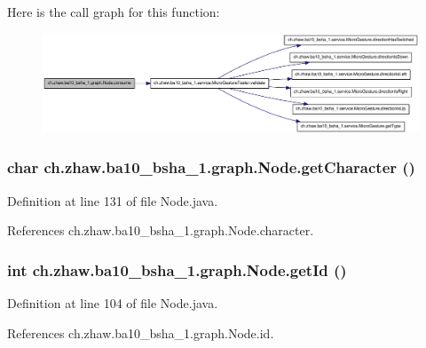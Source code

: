 Here is the call graph for this function:\nopagebreak
\begin{figure}[H]
\begin{center}
\leavevmode
\includegraphics[width=420pt]{classch_1_1zhaw_1_1ba10__bsha__1_1_1graph_1_1Node_a985b135e0ae7c0453985cd1dacdc4bc7_cgraph}
\end{center}
\end{figure}
\hypertarget{classch_1_1zhaw_1_1ba10__bsha__1_1_1graph_1_1Node_a0e84a9cb9ac03506d3a46af0a8f288f5}{
\subsubsection[{getCharacter}]{\setlength{\rightskip}{0pt plus 5cm}char ch.zhaw.ba10\_\-bsha\_\-1.graph.Node.getCharacter ()}}
\label{classch_1_1zhaw_1_1ba10__bsha__1_1_1graph_1_1Node_a0e84a9cb9ac03506d3a46af0a8f288f5}


Definition at line 131 of file Node.java.

References ch.zhaw.ba10\_\-bsha\_\-1.graph.Node.character.\hypertarget{classch_1_1zhaw_1_1ba10__bsha__1_1_1graph_1_1Node_a725596466df160f7aa65009dbd29e3d8}{
\subsubsection[{getId}]{\setlength{\rightskip}{0pt plus 5cm}int ch.zhaw.ba10\_\-bsha\_\-1.graph.Node.getId ()}}
\label{classch_1_1zhaw_1_1ba10__bsha__1_1_1graph_1_1Node_a725596466df160f7aa65009dbd29e3d8}


Definition at line 104 of file Node.java.

References ch.zhaw.ba10\_\-bsha\_\-1.graph.Node.id.

